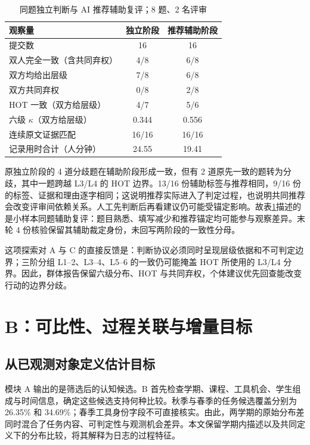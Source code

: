 \documentclass[withoutpreface,bwprint]{cumcmthesis}
\begin{document}
\begin{table}[htbp]\centering\small
\caption{同题独立判断与 AI 推荐辅助复评；8 题、2 名评审}\label{tab:human}
\begin{tabular}{@{}lcc@{}}\toprule
观察量 & 独立阶段 & 推荐辅助阶段\\\midrule
提交数 & 16 & 16\\
双人完全一致（含共同弃权） & 4/8 & 6/8\\
双方均给出层级 & 7/8 & 6/8\\
双方共同弃权 & 0/8 & 2/8\\
HOT 一致（双方给层级） & 4/7 & 5/6\\
六级 $\kappa$（双方给层级） & 0.344 & 0.556\\
连续原文证据匹配 & 16/16 & 16/16\\
记录用时合计（人分钟） & 24.55 & 19.41\\\bottomrule
\end{tabular}
\end{table}

\FinalHumanResults{}

原独立阶段的 4 道分歧题在辅助阶段形成一致，但有 2 道原先一致的题转为分歧，其中一题跨越 L3/L4 的 HOT 边界。13/16 份辅助标签与推荐相同，9/16 份的标签、证据和理由逐字相同；这说明推荐实际进入了判定过程，也说明共同推荐会改变评审间依赖关系。人工先判断后再看建议仍可能受锚定影响\cite{bucinca2021_forcing,ashktorab2024_reliance}。故表\ref{tab:human}描述的是小样本同题辅助复评：题目熟悉、填写减少和推荐锚定均可能参与观察差异。末轮 4 份核验保留其辅助裁定身份，未回写两阶段的一致性分母。

这项探索对 A 与 C 的直接反馈是：判断协议必须同时呈现层级依据和不可判定边界；三阶分组 L1--2、L3--4、L5--6 的一致仍可能掩盖 HOT 所使用的 L3/L4 分界。因此，群体报告保留六级分布、HOT 与共同弃权，个体建议优先回查能改变行动的边界分歧。

\section{B：可比性、过程关联与增量目标}
\subsection{从已观测对象定义估计目标}
模块 A 输出的是筛选后的认知候选。B 首先检查学期、课程、工具机会、学生组成与时间信息，确定这些候选支持何种比较。秋季与春季的任务候选覆盖分别为 26.35\% 和 34.69\%；春季工具身份字段不可直接核实。由此，两学期的原始分布差同时混合了任务内容、可判定性与观测机会差异。本文保留学期内描述以及共同定义下的分布比较，将其解释为日志的过程特征。
\end{document}
